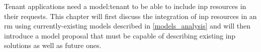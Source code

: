 Tenant applications need a \gls{model:tenant} to be able to include \gls{inp} resources in their requests.
This chapter will first discuss the integration of \gls{inp} resources in an \gls{rm} using currently-existing models described in \autoref{models_analysis} and will then introduce a model proposal that must be capable of describing existing \gls{inp} solutions as well as future ones.